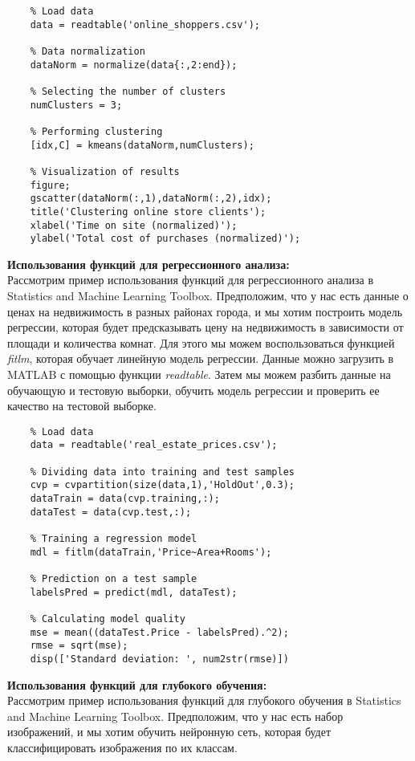 \documentclass[a4paper, 12pt]{article}%
\begin{document}
\begin{titlepage}
	
	\begin{lstlisting}
	% Load data
	data = readtable('online_shoppers.csv');
	
	% Data normalization
	dataNorm = normalize(data{:,2:end});
	
	% Selecting the number of clusters
	numClusters = 3;
	
	% Performing clustering
	[idx,C] = kmeans(dataNorm,numClusters);
	
	% Visualization of results
	figure;
	gscatter(dataNorm(:,1),dataNorm(:,2),idx);
	title('Clustering online store clients');
	xlabel('Time on site (normalized)');
	ylabel('Total cost of purchases (normalized)');
	\end{lstlisting}
	
	
	\textbf{Использования функций для регрессионного анализа:}\\
	Рассмотрим пример использования функций для регрессионного анализа в Statistics and Machine Learning Toolbox. Предположим, что у нас есть данные о ценах на недвижимость в разных районах города, и мы хотим построить модель регрессии, которая будет предсказывать цену на недвижимость в зависимости от площади и количества комнат.
	Для этого мы можем воспользоваться функцией \textit{fitlm}, которая обучает линейную модель регрессии. Данные можно загрузить в MATLAB с помощью функции \textit{readtable}. Затем мы можем разбить данные на обучающую и тестовую выборки, обучить модель регрессии и проверить ее качество на тестовой выборке.\\
	
	
	\begin{lstlisting}
	% Load data
	data = readtable('real_estate_prices.csv');
	
	% Dividing data into training and test samples
	cvp = cvpartition(size(data,1),'HoldOut',0.3);
	dataTrain = data(cvp.training,:);
	dataTest = data(cvp.test,:);
	
	% Training a regression model
	mdl = fitlm(dataTrain,'Price~Area+Rooms');
	
	% Prediction on a test sample
	labelsPred = predict(mdl, dataTest);
	
	% Calculating model quality
	mse = mean((dataTest.Price - labelsPred).^2);
	rmse = sqrt(mse);
	disp(['Standard deviation: ', num2str(rmse)])
	\end{lstlisting}
	
	
	\textbf{Использования функций для глубокого обучения:}\\
	Рассмотрим пример использования функций для глубокого обучения в Statistics and Machine Learning Toolbox. Предположим, что у нас есть набор изображений, и мы хотим обучить нейронную сеть, которая будет классифицировать изображения по их классам.
	

\end{titlepage}
\end{document}
